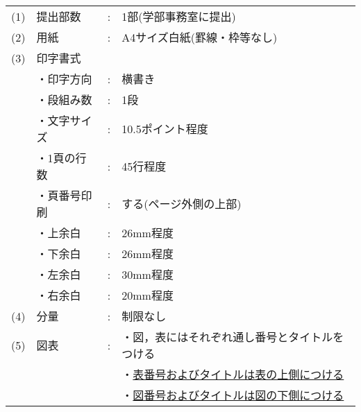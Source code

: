 \begin{tabular}{llcl}
  (1) & 提出部数                  & : & 1部(学部事務室に提出)                                    \\
  (2) & 用紙                      & : & A4サイズ白紙(罫線・枠等なし)                             \\
  (3) & 印字書式                  &   &                                                          \\
      & \hspace*{1zw}・印字方向   & : & 横書き                                                   \\
      & \hspace*{1zw}・段組み数   & : & 1段                                                      \\
      & \hspace*{1zw}・文字サイズ & : & 10.5ポイント程度                                         \\
      & \hspace*{1zw}・1頁の行数  & : & 45行程度                                                 \\
      & \hspace*{1zw}・頁番号印刷 & : & する(ページ外側の上部)                                   \\
      & \hspace*{1zw}・上余白     & : & 26mm程度                                                 \\
      & \hspace*{1zw}・下余白     & : & 26mm程度                                                 \\
      & \hspace*{1zw}・左余白     & : & 30mm程度                                                 \\
      & \hspace*{1zw}・右余白     & : & 20mm程度                                                 \\
  (4) & 分量                      & : & 制限なし                                                 \\
  (5) & 図表                      & : & ・図，表にはそれぞれ通し番号とタイトルをつける           \\
      &                           &   & ・\underline{表番号およびタイトルは表の上側につける}     \\
      &                           &   & ・\underline{図番号およびタイトルは図の下側につける}     \\

\end{tabular}
